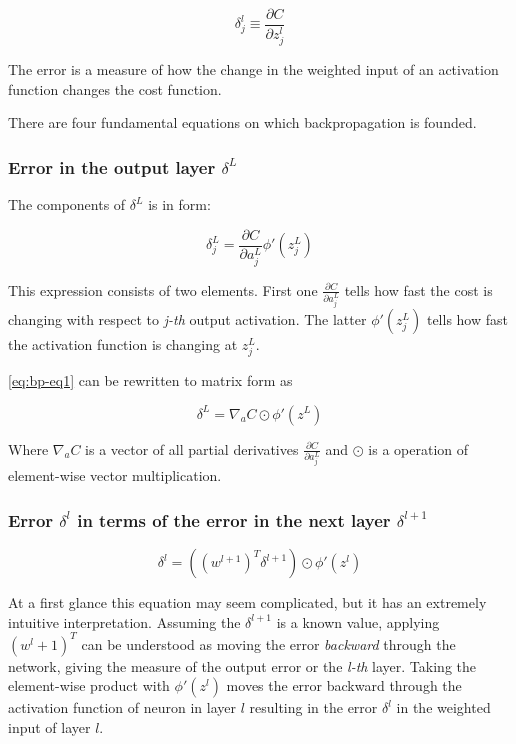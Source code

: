 \begin{equation}
    \delta^l_j \equiv \frac{\partial C}{\partial z^l_j}
\end{equation}

The error is a measure of how the change in the weighted input of an activation function changes the cost function.

There are four fundamental equations on which backpropagation is founded.

\subsubsection*{Error in the output layer $\delta^L$}
\label{sub2:error-in-the-output-layer}

The components of $\delta^L$ is in form:

\begin{equation}
\delta^L_j = \frac{\partial C}{\partial a^L_j}\phi'(z^L_j)
\tag{EQ1}
\label{eq:bp-eq1}
\end{equation}

This expression consists of two elements. First one $\frac{\partial C}{\partial a^L_j}$ tells how fast the cost is changing with respect to \emph{j-th} output activation. The latter $\phi'(z^L_j)$ tells how fast the activation function is changing at $z^L_j$.

\ref{eq:bp-eq1} can be rewritten to matrix form as

\begin{equation}
    \delta^L = \nabla_a C \odot \phi'(z^L)
    \tag{EQ1a}
    \label{eq:bp-eq1a}
\end{equation}

Where $\nabla_a C$ is a vector of all partial derivatives $\frac{\partial C}{\partial a^L_j}$ and $\odot$ is a operation of element-wise vector multiplication.

\subsubsection*{Error $\delta^l$ in terms of the error in the next layer $\delta^{l+1}$}
\label{sub2:delta-l-to-delta-l+1}

\begin{equation}
    \delta^l = \left((w^{l+1})^T\delta^{l+1}\right) \odot \phi'(z^l)
    \tag{EQ2}
    \label{eq:bp-eq2}
\end{equation}

At a first glance this equation may seem complicated, but it has an extremely intuitive interpretation. Assuming the $\delta^{l+1}$ is a known value, applying $(w^l+1)^T$ can be understood as moving the error \emph{backward} through the network, giving the measure of the output error or the \emph{l-th} layer. Taking the element-wise product with $\phi'(z^l)$ moves the error backward through the activation function of neuron in layer $l$ resulting in the error $\delta^l$ in the weighted input of layer $l$.

